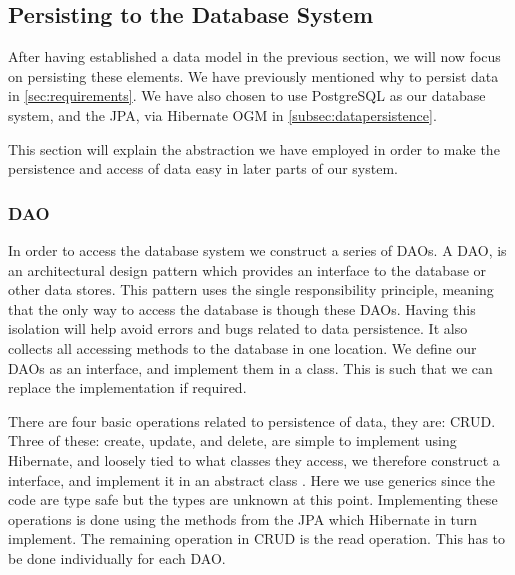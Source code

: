 \subsection{Persisting to the Database System}\label{subsec:persistingtodb}

After having established a data model in the previous section, we will now focus on persisting these elements.
We have previously mentioned why to persist data in \cref{sec:requirements}.
We have also chosen to use PostgreSQL as our database system, and the \ac{JPA}, via Hibernate OGM in \cref{subsec:datapersistence}.

This section will explain the abstraction we have employed in order to make the persistence and access of data easy in later parts of our system.

\subsubsection*{\acl{DAO}}\label{subsubsec:dao}
In order to access the database system we construct a series of \acp{DAO}.
A \ac{DAO}, is an architectural design pattern which provides an interface to the database or other data stores\cite{oracle_dao}.
This pattern uses the single responsibility principle, meaning that the only way to access the database is though these \acp{DAO}.
Having this isolation will help avoid errors and bugs related to data persistence.
It also collects all accessing methods to the database in one location.
We define our \acp{DAO} as an interface, and implement them in a class.
This is such that we can replace the implementation if required. 

There are four basic operations related to persistence of data, they are: \ac{CRUD}.
Three of these: create, update, and delete, are simple to implement using Hibernate, and loosely tied to what classes they access, we therefore construct a  interface, and implement it in an abstract class .
Here we use generics since the code are type safe but the types are unknown at this point.
Implementing these operations is done using the methods from the \ac{JPA} which Hibernate in turn implement.
The remaining operation in \ac{CRUD} is the read operation.
This has to be done individually for each \ac{DAO}.

